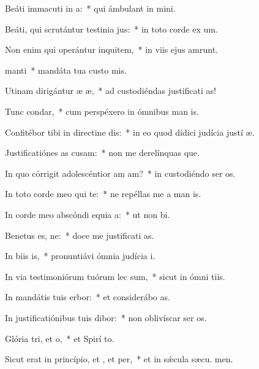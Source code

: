\item Beáti immacuti in a:~* qui ámbulant in  mini.
\item Beáti, qui scrutántur testinia jus:~* in toto corde ex um.
\item Non enim qui operántur inquitem,~* in viis ejus amrunt.
\item {} manti~* mandáta tua custo mis.
\item Utinam dirigántur æ æ,~* ad custodiéndas justificati as!
\item Tunc  condar,~* cum perspéxero in ómnibus man is.
\item Confitébor tibi in directine dis:~* in eo quod dídici judícia justí æ.
\item Justificatiónes as cusam:~* non me derelínquas que.
\item In quo córrigit adolescéntior am am?~* in custodiéndo ser os.
\item In toto corde meo qui te:~* ne repéllas me a man is.
\item In corde meo abscóndi equia a:~* ut non  bi.
\item Benetus es, ne:~* doce me justificati as.
\item In biis is,~* pronuntiávi ómnia judícia  i.
\item In via testimoniórum tuórum lec sum,~* sicut in ómni tiis.
\item In mandátis tuis erbor:~* et considerábo  as.
\item In justificatiónibus tuis dibor:~* non oblivíscar ser os.
\item Glória tri, et o,~* et Spirí to.
\item Sicut erat in princípio, et , et per,~* et in sǽcula sæcu. men.

